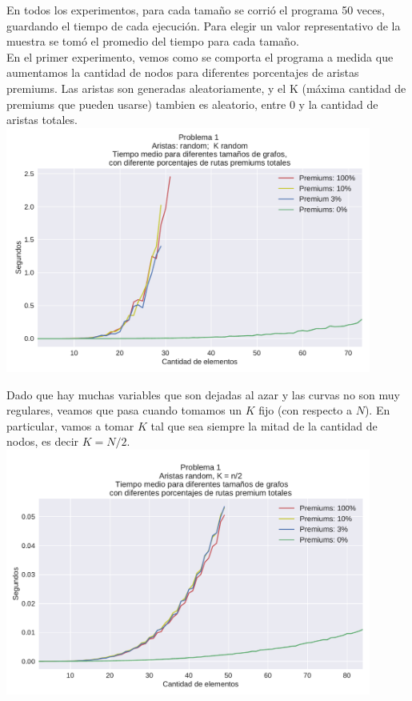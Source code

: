 En todos los experimentos, para cada tamaño se corrió el programa 50 veces, guardando el tiempo de cada ejecución. Para elegir un valor representativo de la muestra se tomó el promedio del tiempo para cada tamaño. \\

En el primer experimento, vemos como se comporta el programa a medida que aumentamos la cantidad de nodos para diferentes porcentajes de aristas premiums. Las aristas son generadas aleatoriamente, y el K (máxima cantidad de premiums que pueden usarse) tambien es aleatorio, entre 0 y la cantidad de aristas totales. \\

{\centering
  \includegraphics[width=0.9\textwidth]{imagenes/problema1/todo_random_bis.pdf} \\
}

Dado que hay muchas variables que son dejadas al azar y las curvas no son muy regulares, veamos que pasa cuando tomamos un $K$ fijo (con respecto a $N$). En particular, vamos a tomar $K$ tal que sea siempre la mitad de la cantidad de nodos, es decir $K = N/2$. \\

{\centering
  \includegraphics[width=0.9\textwidth]{imagenes/problema1/kfijo.pdf} \\
}

